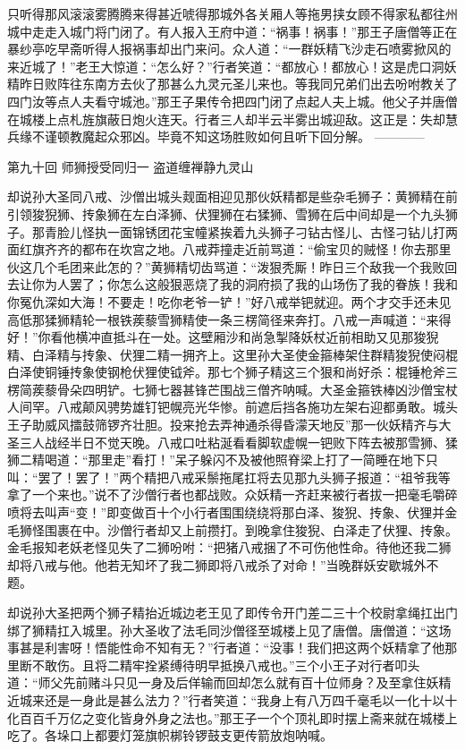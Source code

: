 \documentclass[12pt,UTF8]{ctexbook}
\begin{document}
{	只听得那风滚滚雾腾腾来得甚近唬得那城外各关厢人等拖男挟女顾不得家私都往州城中走走入城门将门闭了。有人报入王府中道：“祸事！祸事！”那王子唐僧等正在暴纱亭吃早斋听得人报祸事却出门来问。众人道：“一群妖精飞沙走石喷雾掀风的来近城了！”老王大惊道：“怎么好？”行者笑道：“都放心！都放心！这是虎口洞妖精昨日败阵往东南方去伙了那甚么九灵元圣儿来也。等我同兄弟们出去吩咐教关了四门汝等点人夫看守城池。”那王子果传令把四门闭了点起人夫上城。他父子并唐僧在城楼上点札旌旗蔽日炮火连天。行者三人却半云半雾出城迎敌。这正是：失却慧兵缘不谨顿教魔起众邪凶。毕竟不知这场胜败如何且听下回分解。
	------------
	
	第九十回 师狮授受同归一 盗道缠禅静九灵山
	
	却说孙大圣同八戒、沙僧出城头觌面相迎见那伙妖精都是些杂毛狮子：黄狮精在前引领狻猊狮、抟象狮在左白泽狮、伏狸狮在右猱狮、雪狮在后中间却是一个九头狮子。那青脸儿怪执一面锦锈团花宝幢紧挨着九头狮子刁钻古怪儿、古怪刁钻儿打两面红旗齐齐的都布在坎宫之地。八戒莽撞走近前骂道：“偷宝贝的贼怪！你去那里伙这几个毛团来此怎的？”黄狮精切齿骂道：“泼狠秃厮！昨日三个敌我一个我败回去让你为人罢了；你怎么这般狠恶烧了我的洞府损了我的山场伤了我的眷族！我和你冤仇深如大海！不要走！吃你老爷一铲！”好八戒举钯就迎。两个才交手还未见高低那猱狮精轮一根铁蒺藜雪狮精使一条三楞简径来奔打。八戒一声喊道：“来得好！”你看他横冲直抵斗在一处。这壁厢沙和尚急掣降妖杖近前相助又见那狻猊精、白泽精与抟象、伏狸二精一拥齐上。这里孙大圣使金箍棒架住群精狻猊使闷棍白泽使铜锤抟象使钢枪伏狸使钺斧。那七个狮子精这三个狠和尚好杀：棍锤枪斧三楞简蒺藜骨朵四明铲。七狮七器甚锋芒围战三僧齐呐喊。大圣金箍铁棒凶沙僧宝杖人间罕。八戒颠风骋势雄钉钯幌亮光华惨。前遮后挡各施功左架右迎都勇敢。城头王子助威风擂鼓筛锣齐壮胆。投来抢去弄神通杀得昏濛天地反”那一伙妖精齐与大圣三人战经半日不觉天晚。八戒口吐粘涎看看脚软虚幌一钯败下阵去被那雪狮、猱狮二精喝道：“那里走”看打！”呆子躲闪不及被他照脊梁上打了一简睡在地下只叫：“罢了！罢了！”两个精把八戒采鬃拖尾扛将去见那九头狮子报道：“祖爷我等拿了一个来也。”说不了沙僧行者也都战败。众妖精一齐赶来被行者拔一把毫毛嚼碎喷将去叫声“变！”即变做百十个小行者围围绕绕将那白泽、狻猊、抟象、伏狸并金毛狮怪围裹在中。沙僧行者却又上前攒打。到晚拿住狻猊、白泽走了伏狸、抟象。金毛报知老妖老怪见失了二狮吩咐：“把猪八戒捆了不可伤他性命。待他还我二狮却将八戒与他。他若无知坏了我二狮即将八戒杀了对命！”当晚群妖安歇城外不题。
	
	却说孙大圣把两个狮子精抬近城边老王见了即传令开门差二三十个校尉拿绳扛出门绑了狮精扛入城里。孙大圣收了法毛同沙僧径至城楼上见了唐僧。唐僧道：“这场事甚是利害呀！悟能性命不知有无？”行者道：“没事！我们把这两个妖精拿了他那里断不敢伤。且将二精牢拴紧缚待明早抵换八戒也。”三个小王子对行者叩头道：“师父先前赌斗只见一身及后佯输而回却怎么就有百十位师身？及至拿住妖精近城来还是一身此是甚么法力？”行者笑道：“我身上有八万四千毫毛以一化十以十化百百千万亿之变化皆身外身之法也。”那王子一个个顶礼即时摆上斋来就在城楼上吃了。各垛口上都要灯笼旗帜梆铃锣鼓支更传箭放炮呐喊。
	
}
\end{document}
